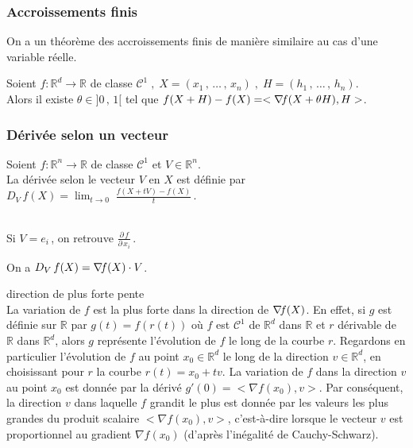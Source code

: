 \documentclass[class=report,crop=false]{standalone}
\begin{document}
{{\subsubsection{Accroissements finis}
On a un théor\`eme des accroissements finis de mani\`ere similaire au cas d'une variable réelle.

\begin{theoreme}
Soient $f : \mathbb{R}^d \rightarrow \mathbb{R}$ de classe $\mathcal{C}^1\;,\; X = (x_{1} \,,\, \dots \,,\, x_{n}) \;,\; H = (h_{1} \,,\, \dots \,,\, h_{n})$.\\
Alors il existe $\theta \in ]0\,,\,1[$ tel que $f(X + H) - f(X) = < \nabla\hspace{-0.6mm} f(X + \theta H) , H>$.
\end{theoreme}


\subsubsection{Dérivée selon un vecteur}


\begin{definition}
Soient $f : \mathbb{R}^n \rightarrow \mathbb{R}$ de classe $\mathcal{C}^1$ et $V \in \mathbb{R}^n$.\\
La dérivée selon le vecteur $V$ en $X$ est définie par $D_{V}\, f(X) = \displaystyle \lim_{t \rightarrow 0} \; \frac{f(X + tV) - f(X)}{t}$\,.
\end{definition}


\\
Si $V = e_{i}$\,, on retrouve $\displaystyle \frac{\partial\, f}{\partial\, x_{i}}$\,.


\begin{proposition}On a $D_{V}\, f(X) = \nabla\hspace{-0.6mm} f(X) \cdot V$.\end{proposition}



 direction de plus forte pente\\
La variation de $f$ est la plus forte dans la direction de $\nabla\hspace{-0.6mm} f(X)$. En effet, si $g$ est définie sur $\mathbb{R}$ par $g(t) = f(r(t))$ o\`u $f$ est $\mathcal{C}^1$ de $\mathbb{R}^d$ dans $\mathbb{R}$ et $r$ dérivable de $\mathbb{R}$ dans $\mathbb{R}^d$, alors $g$ représente l'évolution de $f$ le long de la courbe $r$. Regardons en particulier l'évolution de $f$ au point $x_0\in \mathbb R^d$ le long de la direction $v\in \mathbb R^d$, en choisissant pour $r$ la courbe $r(t)=x_0+tv$. La variation de $f$ dans la direction $v$ au point $x_0$ est donnée par la dérivé $g'(0)=<\nabla f(x_0),v>$. Par conséquent, la direction $v$ dans laquelle $f$ grandit le plus est donnée par les valeurs les plus grandes du produit scalaire $<\nabla f(x_0),v>$, c'est-\`a-dire lorsque le vecteur $v$ est proportionnel au gradient $\nabla f(x_0)$ (d'apr\`es l'inégalité de Cauchy-Schwarz).

}}
\end{document}
